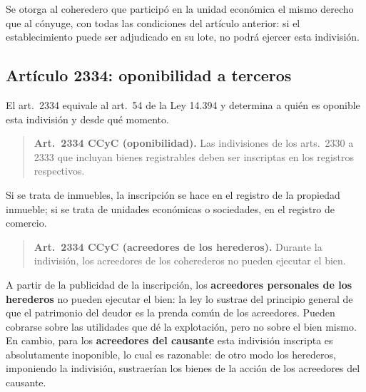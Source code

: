 \documentclass[12pt,oneside]{book}
\begin{document}
Se otorga al coheredero que participó en la unidad económica el mismo derecho que al cónyuge, con todas las condiciones del artículo anterior: si el establecimiento puede ser adjudicado en su lote, no podrá ejercer esta indivisión.

\subsection{Artículo 2334: oponibilidad a terceros}

El art.~2334 equivale al art.~54 de la Ley 14.394 y determina a quién es oponible esta indivisión y desde qué momento.

\begin{quote}
\textbf{Art.~2334 CCyC (oponibilidad).} Las indivisiones de los arts.~2330 a 2333 que incluyan bienes registrables deben ser inscriptas en los registros respectivos.
\end{quote}

Si se trata de inmuebles, la inscripción se hace en el registro de la propiedad inmueble; si se trata de unidades económicas o sociedades, en el registro de comercio.

\begin{quote}
\textbf{Art.~2334 CCyC (acreedores de los herederos).} Durante la indivisión, los acreedores de los coherederos no pueden ejecutar el bien.
\end{quote}

A partir de la publicidad de la inscripción, los \textbf{acreedores personales de los herederos} no pueden ejecutar el bien: la ley lo sustrae del principio general de que el patrimonio del deudor es la prenda común de los acreedores. Pueden cobrarse sobre las utilidades que dé la explotación, pero no sobre el bien mismo. En cambio, para los \textbf{acreedores del causante} esta indivisión inscripta es absolutamente inoponible, lo cual es razonable: de otro modo los herederos, imponiendo la indivisión, sustraerían los bienes de la acción de los acreedores del causante.
\end{document}
